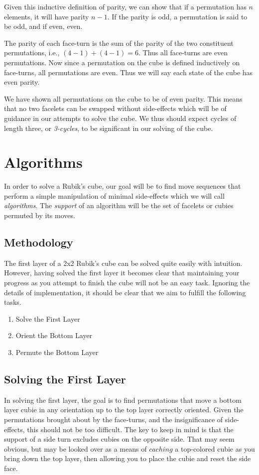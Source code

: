 \documentclass{article}
\begin{document}
Given this inductive definition of parity, we can show that if a permutation 
has $n$ elements, it will have parity $n-1$. If the parity is odd, a 
permutation is said to be odd, and if even, even.

The parity of each face-turn is the sum of the parity of the two constituent 
permutations, i.e., $(4-1)+(4-1) = 6$. Thus all face-turns are even 
permutations. Now since a permutation on the cube is defined inductively on 
face-turns, all permutations are even. Thus we will say each state of the 
cube has even parity.

We have shown all permutations on the cube to be of even parity. This means 
that no two facelets can be swapped without side-effects which will be of 
guidance in our attempts to solve the cube. We thus should expect cycles of 
length three, or \emph{3-cycles}, to be significant in our solving of the 
cube.

\section{Algorithms}
In order to solve a Rubik's cube, our goal will be to find move sequences 
that perform a simple manipulation of minimal side-effects which we will call 
\emph{algorithms}. The \emph{support} of an algorithm will be the set of 
facelets or cubies permuted by its moves.

\subsection{Methodology}
The first layer of a 2x2 Rubik's cube can be solved quite easily with 
intuition. However, having solved the first layer it becomes clear that 
maintaining your progress as you attempt to finish the cube will not be an 
easy task. Ignoring the details of implementation, it should be clear that we 
aim to fulfill the following tasks.

\begin{enumerate}
  \item Solve the First Layer
  \item Orient the Bottom Layer
  \item Permute the Bottom Layer
\end{enumerate}  

\subsection{Solving the First Layer}
In solving the first layer, the goal is to find permutations that move a 
bottom layer cubie in any orientation up to the top layer correctly oriented. 
Given the permutations brought about by the face-turns, and the 
insignificance of side-effects, this should not be too difficult. The key to 
keep in mind is that the support of a side turn excludes cubies on the 
opposite side. That may seem obvious, but may be looked over as a means of 
$caching$ a top-colored cubie as you bring down the top layer, then allowing 
you to place the cubie and reset the side face.
\end{document}
